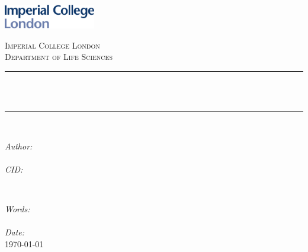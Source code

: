 \begin{titlepage}
    
    \newcommand{\HRule}{\rule{\linewidth}{0.5mm}} %
    
    
    \includegraphics[width = 4cm]{../Writeup/imperial.pdf}\\[0.5cm] 
    
    \center %
    
    
    \textsc{\Large Imperial College London}\\[0.5cm] 
    \textsc{\large Department of Life Sciences}\\[0.5cm] 
    
    
    \HRule \\[0.4cm]
    { \huge \bfseries \reporttitle}\\ %
    \HRule \\[1.5cm]
     
    
    \begin{minipage}{0.4\textwidth}
    \begin{flushleft} \large
    \emph{Author:}\\
    \reportauthor \\ [0.5cm] %
    \emph{CID:}\\
    \reportcid %
    \end{flushleft}
    \end{minipage}
    ~
    \begin{minipage}{0.4\textwidth}
    \begin{flushright} \large
    \emph{Words:} \\
    \words \\ [0.5cm] %
    \emph{Date:} \\
    \today \\ [0.5cm] %
    \end{flushright}
    \end{minipage}\\[4cm]
    

\end{titlepage}
